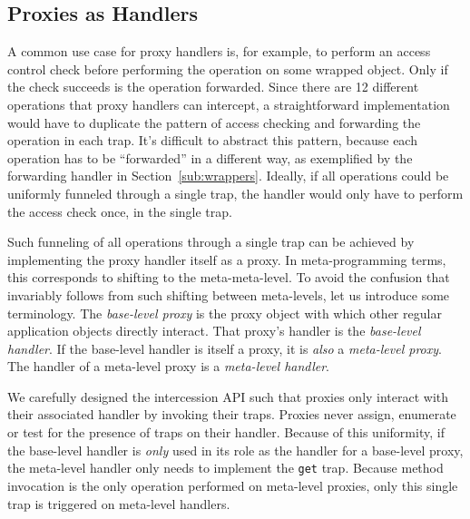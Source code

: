 \documentclass{sig-alternate}
\begin{document}
\subsection{Proxies as Handlers}
\label{sub:doublelifting}

A common use case for proxy handlers is, for example, to perform an access control check before performing the operation on some wrapped object. Only if the check succeeds is the operation forwarded. Since there are 12 different operations that proxy handlers can intercept, a straightforward implementation would have to duplicate the pattern of access checking and forwarding the operation in each trap. It's difficult to abstract this pattern, because each operation has to be ``forwarded'' in a different way, as exemplified by the forwarding handler in Section~\ref{sub:wrappers}. Ideally, if all operations could be uniformly funneled through a single trap, the handler would only have to perform the access check once, in the single trap.

Such funneling of all operations through a single trap can be achieved by implementing the proxy handler itself as a proxy. In meta-programming terms, this corresponds to shifting to the meta-meta-level. To avoid the confusion that invariably follows from such shifting between meta-levels, let us introduce some terminology. The \emph{base-level proxy} is the proxy object with which other regular application objects directly interact. That proxy's handler is the \emph{base-level handler}. If the base-level handler is itself a proxy, it is \emph{also} a \emph{meta-level proxy}. The handler of a meta-level proxy is a \emph{meta-level handler}.

We carefully designed the intercession API such that proxies only interact with their associated handler by invoking their traps. Proxies never assign, enumerate or test for the presence of traps on their handler. Because of this uniformity, if the base-level handler is \emph{only} used in its role as the handler for a base-level proxy, the meta-level handler only needs to implement the \texttt{get} trap. Because method invocation is the only operation performed on meta-level proxies, only this single trap is triggered on meta-level handlers.
\end{document}
